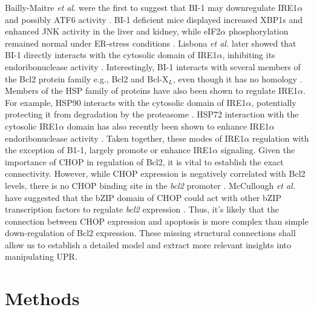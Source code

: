 \documentclass[fleqn,10pt]{wlscirep}
\begin{document}
Bailly-Maitre \emph{et al.} were the first to suggest that BI-1 may downregulate IRE1$\alpha$ and possibly ATF6 activity \cite{Bailly-Maitre:2006bh}.
BI-1 deficient mice displayed increased XBP1s and enhanced JNK activity in the liver and kidney, while eIF2$\alpha$ phosphorylation remained normal under ER-stress conditions \cite{Bailly-Maitre:2006bh}.
Lisbona \emph{et al.} later showed that BI-1 directly interacts with the cytosolic domain of IRE1$\alpha$, inhibiting its endoribonuclease activity \cite{Lisbona:2009cr}.
Interestingly, BI-1 interacts with several members of the Bcl2 protein family e.g., Bcl2 and Bcl-X$_{L}$, even though it has no homology \cite{Xu:1998dq}.
Members of the HSP family of proteins have also been shown to regulate IRE1$\alpha$.
For example, HSP90 interacts with the cytosolic domain of IRE1$\alpha$, potentially protecting it from degradation by the proteasome \cite{Marcu:2002oq}.
HSP72 interaction with the cytosolic IRE1$\alpha$ domain has also recently been shown to enhance IRE1$\alpha$ endoribonuclease activity \cite{Gupta:2010kl}.
Taken together, these modes of IRE1$\alpha$ regulation with the exception of B1-1, largely promote or enhance IRE1$\alpha$ signaling. Given the importance of CHOP in regulation of Bcl2, it is vital to establish the exact connectivity.
However, while CHOP expression is negatively correlated with Bcl2 levels, there is no CHOP binding site in the \emph{bcl2} promoter \cite{mccullough2001gsc}. McCullough \emph{et al.} have suggested that the bZIP domain of CHOP could act with other bZIP transcription factors to regulate \emph{bcl2} expression \cite{mccullough2001gsc}.
Thus, it's likely that the connection between CHOP expression and apoptosis is more complex than simple down-regulation of Bcl2 expression.
These missing structural connections shall allow us to establish a detailed model and extract more relevant insights into manipulating UPR.


\section*{Methods}
\end{document}
